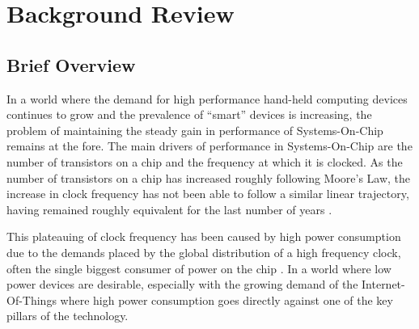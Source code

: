 \documentclass[11pt,english,british]{report}
\begin{document}

\tableofcontents{}

\pagebreak{}




\pagestyle{plain}

\doublespacing
{}
\setcounter{page}{1} 
\chapter{Background Review}
\section{Brief Overview}
In a world where the demand for high performance hand-held computing devices continues to grow and the prevalence of ``smart'' devices is increasing, the problem of maintaining the steady gain in performance of Systems-On-Chip remains at the fore. %
The main drivers of performance in Systems-On-Chip are the number of transistors on a chip and the frequency at which it is clocked.
As the number of transistors on a chip has increased roughly following Moore's Law, the increase in clock frequency has not been able to follow a similar linear trajectory, having remained roughly equivalent for the last number of years \cite{ross2008cpu}.

This plateauing of clock frequency has been caused by high power consumption due to the demands placed by the global distribution of a high frequency clock, often the single biggest consumer of power on the chip \cite{tiwari1998reducing}.
In a world where low power devices are desirable, especially with the growing demand of the Internet-Of-Things where high power consumption goes directly against one of the key pillars of the technology. %
\end{document}
